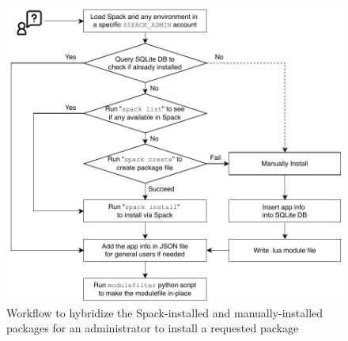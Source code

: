 \documentclass[conference]{IEEEtran}
\begin{document}
\begin{figure}[htbp]
  \centerline{\includegraphics[width=\linewidth]{figures/spack_h2_hybrid_flow}}
  \caption{Workflow to hybridize the Spack-installed and manually-installed packages for an administrator to install a requested package}
  \label{fig:spack_h2_hybrid_flow}
\end{figure}
\end{document}

